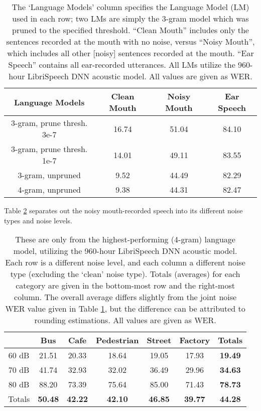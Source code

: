 \documentclass[dissertation,copyright]{uathesis}
\begin{document}
\begin{table}[h]
\begin{center}
\begin{tabular}{| c || c | c | c |} \hline
Language Models & Clean Mouth & Noisy Mouth & Ear Speech \\ \hline\hline
3-gram, prune thresh. 3e-7 & 16.74 & 51.04 & 84.10 \\ \hline
3-gram, prune thresh. 1e-7 & 14.01 & 49.11 & 83.55 \\ \hline
3-gram, unpruned & 9.52 & 44.49 & 82.29 \\ \hline
4-gram, unpruned & 9.38 & 44.31 & 82.47 \\ \hline
\end{tabular}
\end{center}
\caption{The `Language Models' column specifies the Language Model (LM) used in each row; two LMs are simply the 3-gram model which was pruned to the specified threshold.  ``Clean Mouth'' includes only the sentences recorded at the mouth with no noise, versus ``Noisy Mouth'', which includes all other [noisy] sentences recorded at the mouth. ``Ear Speech'' contains all ear-recorded utterances.  All LMs utilize the 960-hour LibriSpeech DNN acoustic model.  All values are given as WER.}\label{tab:basic-run}
\end{table}

Table \ref{tab:split-wer-noise} separates out the noisy mouth-recorded speech into its different noise types and noise levels.

\begin{table}[h]
\begin{center}
\begin{tabular}{| c || c | c | c | c | c || c |} \hline
 & Bus & Cafe & Pedestrian & Street & Factory & Totals \\ \hline\hline
60 dB & 21.51 & 20.33 & 18.64 & 19.05 & 17.93 & \textbf{19.49} \\ \hline
70 dB & 41.74 & 32.93 & 32.02 & 36.49 & 29.96 & \textbf{34.63} \\ \hline
80 dB & 88.20 & 73.39 & 75.64 & 85.00 & 71.43 & \textbf{78.73} \\ \hline\hline
Totals & \textbf{50.48} & \textbf{42.22} & \textbf{42.10} & \textbf{46.85} & \textbf{39.77} & \textbf{44.28} \\ \hline
\end{tabular}
\end{center}
\caption{These are only from the highest-performing (4-gram) language model, utilizing the 960-hour LibriSpeech DNN acoustic model.  Each row is a different noise level, and each column a different noise type (excluding the `clean' noise type).  Totals (averages) for each category are given in the bottom-most row and the right-most column.  The overall average differs slightly from the joint noise WER value given in Table \ref{tab:basic-run}, but the difference can be attributed to rounding estimations. All values are given as WER.}\label{tab:split-wer-noise}
\end{table}
\end{document}
